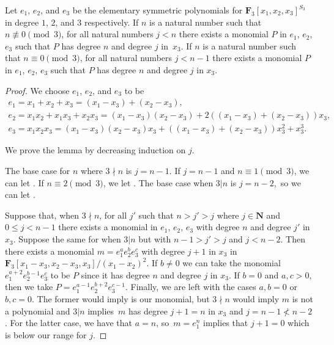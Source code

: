 \begin{Lemma}\label{monAll}
 Let $e_1$, $e_2$, and $e_3$ be the elementary symmetric polynomials for $\mathbf{F}_3[x_1,x_2,x_3]^{S_3}$ in degree $1$, $2$, and $3$ respectively. If $n$ is a natural number such that $n\not\equiv 0\pmod{3}$, for all natural numbers $j<n$ there exists a monomial $P$ in $e_1$, $e_2$, $e_3$ such that $P$ has degree $n$ and degree $j$ in~$x_3$. If $n$ is a natural number such that $n\equiv 0 \pmod{3}$, for all natural numbers $j<n-1$ there exists a monomial $P$ in $e_1$, $e_2$, $e_3$ such that $P$ has degree $n$ and degree $j$ in $x_3$.
\end{Lemma}
\begin{proof}
 We choose $e_1$, $e_2$, and $e_3$ to be
 \begin{gather*}
 e_1=x_1+x_2+x_3=(x_1-x_3)+(x_2-x_3),\\
 e_2=x_1x_2+x_1x_3+x_2x_3=(x_1-x_3)(x_2-x_3)+2((x_1-x_3)+(x_2-x_3))x_3,\\
 e_3=x_1x_2x_3=(x_1-x_3)(x_2-x_3)x_3+((x_1-x_3)+(x_2-x_3))x_3^2 + x_3^3.
 \end{gather*}

 We prove the lemma by decreasing induction on $j$.

 The base case for $n$ where $3\nmid n$ is $j=n-1$. If $j=n-1$ and $n\equiv 1 \pmod{3}$, we can let . If $n\equiv 2 \pmod{3}$, we let . The base case when $3|n$ is $j=n-2$,~so we can let .

 Suppose that, when $3\nmid n$, for all $j'$ such that $n>j'>j$ where $j\in \mathbf{N}$ and $0\leq j<n-1$ there exists a monomial in $e_1$, $e_2$, $e_3$ with degree $n$ and degree $j'$ in $x_3$. Suppose the same for when $3|n$ but with $n-1>j'>j$ and $j<n-2$. Then there exists a monomial $m=e_1^ae_2^be_3^c$ with degree $j+1$ in $x_3$ in $\mathbf{F}_3[x_1-x_3,x_2-x_3,x_3]/(x_1-x_2)^2$. If $b\neq 0$ we can take the monomial $e_1^{a+2}e_2^{b-1}e_3^{c}$ to be $P$ since it has degree $n$ and degree $j$ in $x_3$. If $b=0$ and $a,c>0$, then we take $P=e_1^{a-1}e_2^{b+2}e_3^{c-1}$. Finally, we are left with the cases $a,b=0$ or $b,c=0$. The former would imply  is our monomial, but $3\nmid n$ would imply $m$ is not a polynomial and $3|n$ implies~$m$ has degree $j+1=n$ in $x_3$ and $j=n-1\not < n-2$. For the latter case, we have that $a=n$, so~${m=e_1^{n}}$ implies that $j+1=0$ which is below our range for $j$.
\end{proof}

